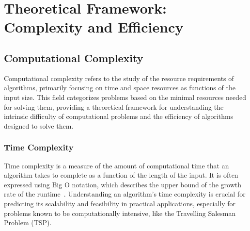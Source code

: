 \chapter{Theoretical Framework: Complexity and Efficiency}\label{chapt:2}

\section{Computational Complexity}

Computational complexity refers to the study of the resource requirements of algorithms, primarily focusing on time and space resources as functions of the input size. This field categorizes problems based on the minimal resources needed for solving them, providing a theoretical framework for understanding the intrinsic difficulty of computational problems and the efficiency of algorithms designed to solve them. ~\cite{GareyJohnson1979}

\subsection{Time Complexity}

Time complexity is a measure of the amount of computational time that an algorithm takes to complete as a function of the length of the input. It is often expressed using Big O notation, which describes the upper bound of the growth rate of the runtime~\cite{BigONotation}. Understanding an algorithm's time complexity is crucial for predicting its scalability and feasibility in practical applications, especially for problems known to be computationally intensive, like the Travelling Salesman Problem (TSP).

